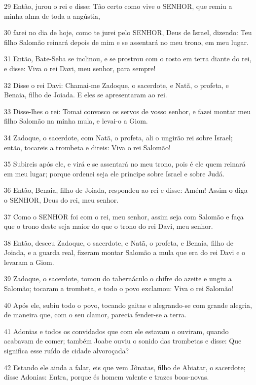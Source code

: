 \par 29 Então, jurou o rei e disse: Tão certo como vive o SENHOR, que remiu a minha alma de toda a angústia,
\par 30 farei no dia de hoje, como te jurei pelo SENHOR, Deus de Israel, dizendo: Teu filho Salomão reinará depois de mim e se assentará no meu trono, em meu lugar.
\par 31 Então, Bate-Seba se inclinou, e se prostrou com o rosto em terra diante do rei, e disse: Viva o rei Davi, meu senhor, para sempre!
\par 32 Disse o rei Davi: Chamai-me Zadoque, o sacerdote, e Natã, o profeta, e Benaia, filho de Joiada. E eles se apresentaram ao rei.
\par 33 Disse-lhes o rei: Tomai convosco os servos de vosso senhor, e fazei montar meu filho Salomão na minha mula, e levai-o a Giom.
\par 34 Zadoque, o sacerdote, com Natã, o profeta, ali o ungirão rei sobre Israel; então, tocareis a trombeta e direis: Viva o rei Salomão!
\par 35 Subireis após ele, e virá e se assentará no meu trono, pois é ele quem reinará em meu lugar; porque ordenei seja ele príncipe sobre Israel e sobre Judá.
\par 36 Então, Benaia, filho de Joiada, respondeu ao rei e disse: Amém! Assim o diga o SENHOR, Deus do rei, meu senhor.
\par 37 Como o SENHOR foi com o rei, meu senhor, assim seja com Salomão e faça que o trono deste seja maior do que o trono do rei Davi, meu senhor.
\par 38 Então, desceu Zadoque, o sacerdote, e Natã, o profeta, e Benaia, filho de Joiada, e a guarda real, fizeram montar Salomão a mula que era do rei Davi e o levaram a Giom.
\par 39 Zadoque, o sacerdote, tomou do tabernáculo o chifre do azeite e ungiu a Salomão; tocaram a trombeta, e todo o povo exclamou: Viva o rei Salomão!
\par 40 Após ele, subiu todo o povo, tocando gaitas e alegrando-se com grande alegria, de maneira que, com o seu clamor, parecia fender-se a terra.
\par 41 Adonias e todos os convidados que com ele estavam o ouviram, quando acabavam de comer; também Joabe ouviu o sonido das trombetas e disse: Que significa esse ruído de cidade alvoroçada?
\par 42 Estando ele ainda a falar, eis que vem Jônatas, filho de Abiatar, o sacerdote; disse Adonias: Entra, porque és homem valente e trazes boas-novas.

